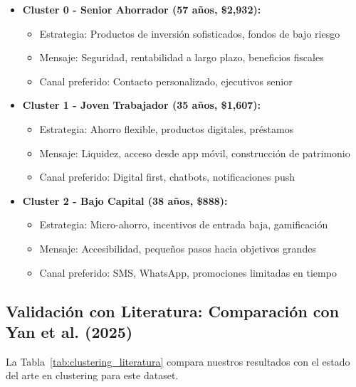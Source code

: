 \documentclass[12pt,letterpaper]{article}
\begin{document}
\begin{itemize}
    \item \textbf{Cluster 0 - Senior Ahorrador (57 años, \$2,932):}
    \begin{itemize}
        \item Estrategia: Productos de inversión sofisticados, fondos de bajo riesgo
        \item Mensaje: Seguridad, rentabilidad a largo plazo, beneficios fiscales
        \item Canal preferido: Contacto personalizado, ejecutivos senior
    \end{itemize}
    
    \item \textbf{Cluster 1 - Joven Trabajador (35 años, \$1,607):}
    \begin{itemize}
        \item Estrategia: Ahorro flexible, productos digitales, préstamos
        \item Mensaje: Liquidez, acceso desde app móvil, construcción de patrimonio
        \item Canal preferido: Digital first, chatbots, notificaciones push
    \end{itemize}
    
    \item \textbf{Cluster 2 - Bajo Capital (38 años, \$888):}
    \begin{itemize}
        \item Estrategia: Micro-ahorro, incentivos de entrada baja, gamificación
        \item Mensaje: Accesibilidad, pequeños pasos hacia objetivos grandes
        \item Canal preferido: SMS, WhatsApp, promociones limitadas en tiempo
    \end{itemize}
\end{itemize}

\subsection{Validación con Literatura: Comparación con Yan et al. (2025)}
\label{subsec:clustering_validacion}

La Tabla~\ref{tab:clustering_literatura} compara nuestros resultados con el estado del arte en clustering para este dataset.
\end{document}
